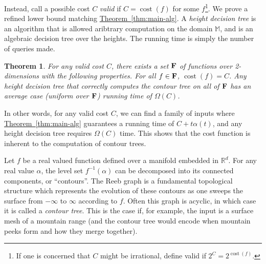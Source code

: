 \documentclass[11pt]{article}
\newtheorem{theorem}{Theorem}
\theoremstyle{definition}
\newcommand{\bF}{{\bf F}}
\newcommand{\MM}{\mathbb{M}}
\newcommand{\RR}{\mathbb{R}}
\newcommand{\Thm}[1]{\hyperref[thm:#1]{Theorem~\ref*{thm:#1}}} %
\newcommand{\cost}{\mathop{cost}}
\begin{document}
Instead, call a possible cost $C$ \emph{valid} if $C = \cost(f)$ for some $f$\footnote{If one is concerned
that $C$ might be irrational, define valid if $2^C = 2^{\cost(f)}$.}. We prove
a refined lower bound matching \Thm{main-alg}. A \emph{height decision tree} is an algorithm
that is allowed aribtrary computation on the domain $\MM$, and is an algebraic decision
tree over the heights. The running time is simply the number of queries made.

\begin{theorem} \label{thm:main-lb} For any valid cost $C$, there exists a set $\bF$ of functions over 2-dimensions
with the following properties.
For all $f \in \bF$, $\cost(f) = C$. Any height decision tree that correctly computes
the contour tree on all of $\bF$ has an average case (uniform over $\bF$) running time of $\Omega(C)$.
\end{theorem}

In other words, for any valid cost $C$, we can find a family of inputs where \Thm{main-alg}
guarantees a running time of $C + t\alpha(t)$, and any height decision tree requires $\Omega(C)$ time.
This shows that the cost function is inherent to the computation of contour trees.


Let $f$ be a real valued function defined over a manifold embedded in $\RR^d$.  
For any real value $\alpha$, the level set $f^{-1}(\alpha)$ can be decomposed into its connected components, or ``contours''.
The Reeb graph is a fundamental topological structure which represents the evolution of these contours as one sweeps the surface 
from $-\infty$ to $\infty$ according to $f$.  Often this graph is acyclic, in which case it is 
called a \emph{contour tree}.  This is the case if, for example, the input is a surface mesh of a mountain range 
(and the contour tree would encode when mountain peeks form and how they merge together).
\end{document}
